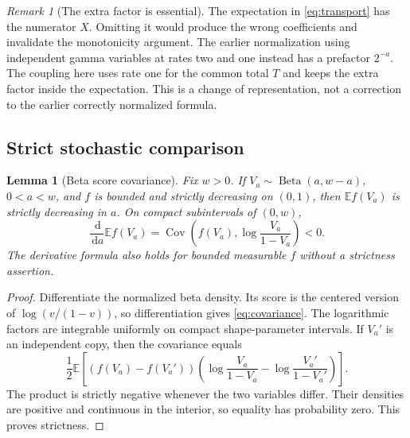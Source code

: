 \documentclass[11pt]{article}
\numberwithin{equation}{section}
\newtheorem{lemma}[theorem]{Lemma}
\theoremstyle{definition}\newtheorem{definition}[theorem]{Definition}
\theoremstyle{remark}\newtheorem{remark}[theorem]{Remark}
\newcommand{\dd}{\,\mathrm d}
\newcommand{\E}{\mathbb E}
\DeclareMathOperator{\Cov}{Cov}
\DeclareMathOperator{\Beta}{Beta}
\begin{document}
\begin{remark}[The extra factor is essential]
The expectation in \eqref{eq:transport} has the numerator $X$. Omitting
it would produce the wrong coefficients and invalidate the monotonicity
argument. The earlier normalization using independent gamma variables at
rates two and one instead has a prefactor $2^{-a}$. The coupling here
uses rate one for the common total $T$ and keeps the extra factor inside
the expectation. This is a change of representation, not a correction
to the earlier correctly normalized formula.
\end{remark}

\subsection{Strict stochastic comparison}
\begin{lemma}[Beta score covariance]\label{lem:beta}
Fix $w>0$. If $V_a\sim\Beta(a,w-a)$, $0<a<w$, and $f$ is bounded and
strictly decreasing on $(0,1)$, then $\E f(V_a)$ is strictly decreasing
in $a$. On compact subintervals of $(0,w)$,
\begin{equation}\label{eq:covariance}
 \frac{\dd}{\dd a}\E f(V_a)
 =\Cov\left(f(V_a),\log\frac{V_a}{1-V_a}\right)<0.
\end{equation}
The derivative formula also holds for bounded measurable $f$ without a
strictness assertion.
\end{lemma}
\begin{proof}
Differentiate the normalized beta density. Its score is the centered
version of $\log(v/(1-v))$, so differentiation gives
\eqref{eq:covariance}. The logarithmic factors are integrable uniformly
on compact shape-parameter intervals. If $V_a'$ is an independent copy,
then the covariance equals
\[
 \frac12\E\left[(f(V_a)-f(V_a'))
 \left(\log\frac{V_a}{1-V_a}-\log\frac{V_a'}{1-V_a'}\right)\right].
\]
The product is strictly negative whenever the two variables differ.
Their densities are positive and continuous in the interior, so equality
has probability zero. This proves strictness.
\end{proof}
\end{document}
